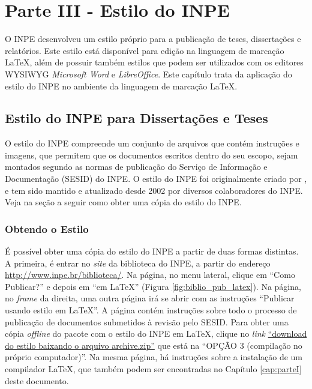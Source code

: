 \chapter{Parte III - Estilo do INPE}
\label{cap:parteIII}

O INPE desenvolveu um estilo próprio para a publicação de teses, dissertações e relatórios. Este estilo está disponível para edição na linguagem de marcação \LaTeX{}, além de possuir também estilos que podem ser utilizados com os editores WYSIWYG \textit{Microsoft Word} e \textit{LibreOffice}. Este capítulo trata da aplicação do estilo do INPE no ambiente da linguagem de marcação \LaTeX{}.

\section{Estilo do INPE para Dissertações e Teses}

O estilo do INPE compreende um conjunto de arquivos que contém instruções e imagens, que permitem que os documentos escritos dentro do seu escopo, sejam montados segundo as normas de publicação do Serviço de Informação e Documentação (SESID) do INPE. O estilo do INPE foi originalmente criado por , e tem sido mantido e atualizado desde 2002 por diversos colaboradores do INPE. Veja na seção a seguir como obter uma cópia do estilo do INPE. %

\subsection*{Obtendo o Estilo}
\label{sec:obter}

É possível obter uma cópia do estilo do INPE a partir de duas formas distintas. A primeira, é entrar no \textit{site} da biblioteca do INPE, a partir do endereço \url{http://www.inpe.br/biblioteca/}. Na página, no menu lateral, clique em ``Como Publicar?'' e depois em ``em \LaTeX{}'' (Figura \ref{fig:biblio_pub_latex}). Na página, no \textit{frame} da direita, uma outra página irá se abrir com as instruções ``Publicar usando estilo em \LaTeX{}''. A página contém instruções sobre todo o processo de publicação de documentos submetidos à revisão pelo SESID. Para obter uma cópia \textit{offline} do pacote com o estilo do INPE em \LaTeX{}, clique no \textit{link} \href{http://mtc-m16c.sid.inpe.br/archive.cgi/sid.inpe.br/iris@1905/2005/08.25.14.01}{``download do estilo baixando o arquivo archive.zip''} que está na ``OPÇÃO 3 (compilação no próprio computador)''. Na mesma página, há instruções sobre a instalação de um compilador \LaTeX{}, que também podem ser encontradas no Capítulo \ref{cap:parteI} deste documento.

